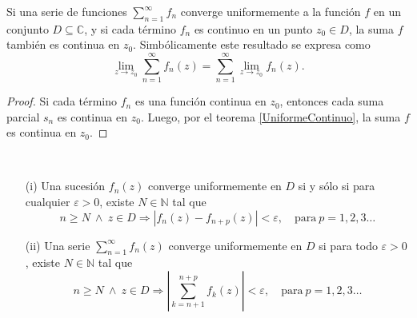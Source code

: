\begin{corolario}  \label{UniformeSerieContinuo}
Si una serie de funciones $\sum\limits_{n=1}^{\infty} f_n$ converge uniformemente a la función $f$ en un conjunto $D \subseteq \mathbb{C}$, y si cada término $f_n$ es continuo en un punto $z_0 \in D$, la suma $f$ también es continua en $z_0$. Simbólicamente este resultado se expresa como
$$\lim_{z\to z_0} \sum_{n=1}^{\infty} f_n(z) = \sum_{n=1}^{\infty} \lim_{z\to z_0} f_n(z).$$
\end{corolario}

\begin{proof}
Si cada término $f_n$ es una función continua en $z_0$, entonces cada suma parcial $s_n$ es continua en $z_0$. Luego, por el teorema \ref{UniformeContinuo}, la suma $f$ es continua en $z_0$.
\end{proof}

\begin{teorema}
\ 

\begin{itemize}
    \item[(i)] Una sucesión $f_n(z)$ converge uniformemente en $D$ si y sólo si para cualquier $\varepsilon > 0$, existe $N \in \mathbb{N}$ tal que 
    $$n \geq N ~\wedge~  z \in D  \Rightarrow |f_n(z) - f_{n+p}(z)| < \varepsilon, \quad \mbox{para} ~ p = 1,2,3 \dots$$
    
    \item[(ii)] Una serie $\sum\limits_{n=1}^{\infty} f_n(z)$ converge uniformemente en $D$ si para todo $\varepsilon > 0$, existe $N \in \mathbb{N}$ tal que 
    $$n \geq N ~\wedge~ z \in D  \Rightarrow \left|\sum_{k=n+1}^{n+p} f_k(z)\right| < \varepsilon, \quad \mbox{para} ~ p = 1,2,3 \dots$$
\end{itemize}
\end{teorema}

